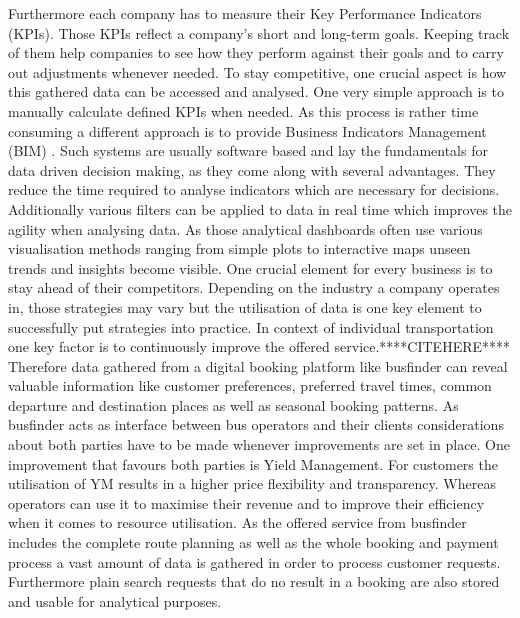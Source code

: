 Furthermore each company has to measure their Key Performance Indicators (KPIs). Those KPIs reflect a company's short and long-term goals. Keeping track of them help companies to see how they perform against their goals and to carry out adjustments whenever needed.\cite{kpi_imrpove_businiess} To stay competitive, one crucial aspect is how this gathered data can be accessed and analysed. One very simple approach is to manually calculate defined KPIs when needed. As this process is rather time consuming a different approach is to provide Business Indicators Management (BIM) \cite{kpi_imrpove_decision_making}. Such systems are usually software based and lay the fundamentals for data driven decision making, as they come along with several advantages. They reduce the time required to analyse indicators which are necessary for decisions. Additionally various filters can be applied to data in real time which improves the agility when analysing data. As those analytical dashboards often use various visualisation methods ranging from simple plots to interactive maps unseen trends and insights become visible.\cite{kpi_imrpove_decision_making}
\newline
\newline 
One crucial element for every business is to stay ahead of their competitors. Depending on the industry a company operates in, those strategies may vary but the utilisation of data is one key element to successfully put strategies into practice.
In context of individual transportation one key factor is to continuously improve the offered service.****CITEHERE**** Therefore data gathered from a digital booking platform like busfinder can reveal valuable information like customer preferences, preferred travel times, common departure and destination places as well as seasonal booking patterns.
\newline
\newline
As busfinder acts as interface between bus operators and their clients considerations about both parties have to be made whenever improvements are set in place. One improvement that favours both parties is Yield Management. For customers the utilisation of YM results in a higher price flexibility and transparency. Whereas operators can use it to maximise their revenue and to improve their efficiency when it comes to resource utilisation.\cite{yield_m} As the offered service from busfinder includes the complete route planning as well as the whole booking and payment process a vast amount of data is gathered in order to process customer requests. Furthermore plain search requests that do no result in a booking are also stored and usable for analytical purposes.
